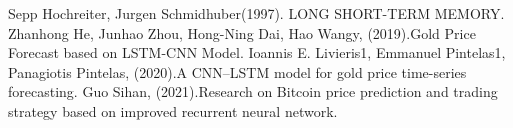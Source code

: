 \documentclass{mcmthesis}
\begin{document}
\begin{thebibliography}{99}%
Sepp Hochreiter, Jurgen Schmidhuber(1997). LONG SHORT-TERM MEMORY.
Zhanhong He, Junhao Zhou, Hong-Ning Dai, Hao Wangy, (2019).Gold Price Forecast based on LSTM-CNN Model.
Ioannis E. Livieris1, Emmanuel Pintelas1, Panagiotis Pintelas, (2020).A CNN–LSTM model for gold price time-series forecasting.
Guo Sihan, (2021).Research on Bitcoin price prediction and trading strategy based on improved recurrent neural network.
\end{thebibliography}
\end{document}
